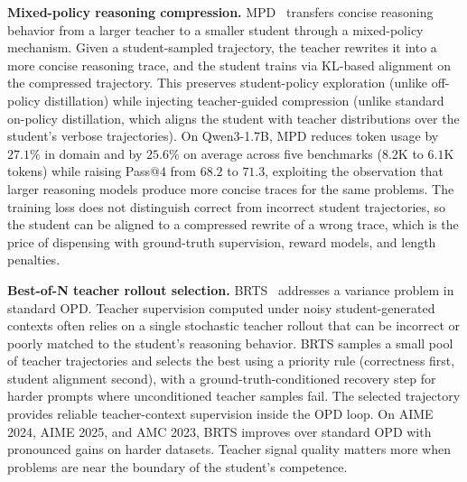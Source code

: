 \documentclass{article} %
\begin{document}
\textbf{Mixed-policy reasoning compression.} MPD~\citep{2605.08776} transfers concise reasoning behavior from a larger teacher to a smaller student through a mixed-policy mechanism. Given a student-sampled trajectory, the teacher rewrites it into a more concise reasoning trace, and the student trains via KL-based alignment on the compressed trajectory. This preserves student-policy exploration (unlike off-policy distillation) while injecting teacher-guided compression (unlike standard on-policy distillation, which aligns the student with teacher distributions over the student's verbose trajectories). On Qwen3-1.7B, MPD reduces token usage by $27.1\%$ in domain and by $25.6\%$ on average across five benchmarks ($8.2$K to $6.1$K tokens) while raising Pass@4 from $68.2$ to $71.3$, exploiting the observation that larger reasoning models produce more concise traces for the same problems. The training loss does not distinguish correct from incorrect student trajectories, so the student can be aligned to a compressed rewrite of a wrong trace, which is the price of dispensing with ground-truth supervision, reward models, and length penalties.

\textbf{Best-of-N teacher rollout selection.} BRTS~\citep{2605.09725} addresses a variance problem in standard OPD. Teacher supervision computed under noisy student-generated contexts often relies on a single stochastic teacher rollout that can be incorrect or poorly matched to the student's reasoning behavior. BRTS samples a small pool of teacher trajectories and selects the best using a priority rule (correctness first, student alignment second), with a ground-truth-conditioned recovery step for harder prompts where unconditioned teacher samples fail. The selected trajectory provides reliable teacher-context supervision inside the OPD loop. On AIME 2024, AIME 2025, and AMC 2023, BRTS improves over standard OPD with pronounced gains on harder datasets. Teacher signal quality matters more when problems are near the boundary of the student's competence.
\end{document}
